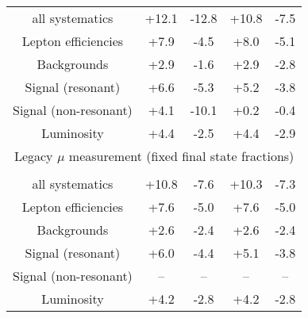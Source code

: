 \begin{table}[htbp]
\begin{tabular}{|c|c|c|c|c|}
all systematics
& +12.1 & -12.8 
& +10.8 & -7.5 \\
Lepton efficiencies
& +7.9 & -4.5 
& +8.0 & -5.1 \\
Backgrounds
& +2.9 & -1.6 
& +2.9 & -2.8 \\
Signal (resonant)
& +6.6 & -5.3 
& +5.2 & -3.8 \\
Signal (non-resonant) 
& +4.1 & -10.1 
& +0.2 & -0.4 \\
Luminosity
& +4.4 & -2.5 
& +4.4 & -2.9 \\
\hline %
\multicolumn{5}{|c|}{Legacy $\mu$ measurement (fixed final state fractions)} \\
\hline %
\vspace{-0.4cm} &&&&\\
all systematics
& +10.8 & -7.6 
& +10.3 & -7.3 \\
Lepton efficiencies
& +7.6 & -5.0 
& +7.6 & -5.0 \\
Backgrounds
& +2.6 & -2.4 
& +2.6 & -2.4 \\
Signal (resonant)
& +6.0 & -4.4 
& +5.1 & -3.8 \\
Signal (non-resonant) 
& -- & -- 
& -- & -- \\
Luminosity
& +4.2 & -2.8 
& +4.2 & -2.8 \\
\hline %
\hline %
\end{tabular}
\end{table}


